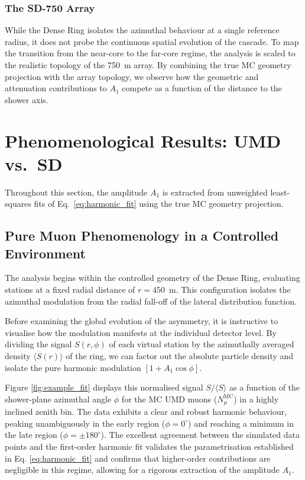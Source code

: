 \documentclass[11pt,a4paper]{article}
\begin{document}
\subsubsection{The SD-750 Array}
While the Dense Ring isolates the azimuthal behaviour at a single reference radius, it does not probe the continuous spatial evolution of the cascade. To map the transition from the near-core to the far-core regime, the analysis is scaled to the realistic topology of the 750~m array. By combining the true MC geometry projection with the array topology, we observe how the geometric and attenuation contributions to $A_1$ compete as a function of the distance to the shower axis.

\section{Phenomenological Results: UMD vs.\ SD}
\label{sec:results}

Throughout this section, the amplitude $A_1$ is extracted from unweighted least-squares fits of Eq.~\eqref{eq:harmonic_fit} using the true MC geometry projection.

\subsection{Pure Muon Phenomenology in a Controlled Environment}
\label{subsec:dense_ring_results}

The analysis begins within the controlled geometry of the Dense Ring, evaluating stations at a fixed radial distance of $r = 450$~m. This configuration isolates the azimuthal modulation from the radial fall-off of the lateral distribution function.

Before examining the global evolution of the asymmetry, it is instructive to visualise how the modulation manifests at the individual detector level. By dividing the signal $S(r, \phi)$ of each virtual station by the azimuthally averaged density $\langle S(r) \rangle$ of the ring, we can factor out the absolute particle density and isolate the pure harmonic modulation $[1 + A_1 \cos \phi]$. 

Figure \ref{fig:example_fit} displays this normalised signal $S/\langle S \rangle$ as a function of the shower-plane azimuthal angle $\phi$ for the MC UMD muons ($N_\mu^{\mathrm{MC}}$) in a highly inclined zenith bin. The data exhibits a clear and robust harmonic behaviour, peaking unambiguously in the early region ($\phi = 0^\circ$) and reaching a minimum in the late region ($\phi = \pm 180^\circ$). The excellent agreement between the simulated data points and the first-order harmonic fit validates the parametrisation established in Eq. \eqref{eq:harmonic_fit} and confirms that higher-order contributions are negligible in this regime, allowing for a rigorous extraction of the amplitude $A_1$.
\end{document}
